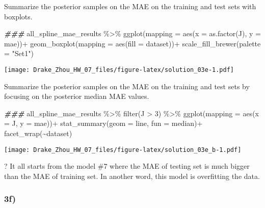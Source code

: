 \documentclass[
]{article}
\newenvironment{Shaded}{\begin{snugshade}}{\end{snugshade}}
\newcommand{\AttributeTok}[1]{\textcolor[rgb]{0.77,0.63,0.00}{#1}}
\newcommand{\DecValTok}[1]{\textcolor[rgb]{0.00,0.00,0.81}{#1}}
\newcommand{\DocumentationTok}[1]{\textcolor[rgb]{0.56,0.35,0.01}{\textbf{\textit{#1}}}}
\newcommand{\FunctionTok}[1]{\textcolor[rgb]{0.00,0.00,0.00}{#1}}
\newcommand{\NormalTok}[1]{#1}
\newcommand{\SpecialCharTok}[1]{\textcolor[rgb]{0.00,0.00,0.00}{#1}}
\newcommand{\StringTok}[1]{\textcolor[rgb]{0.31,0.60,0.02}{#1}}
\begin{document}
Summarize the posterior samples on the MAE on the training and test sets
with boxplots.

\begin{Shaded}
\begin{Highlighting}[]
\DocumentationTok{\#\#\# }
\NormalTok{all\_spline\_mae\_results }\SpecialCharTok{\%\textgreater{}\%}
  \FunctionTok{ggplot}\NormalTok{(}\AttributeTok{mapping =} \FunctionTok{aes}\NormalTok{(}\AttributeTok{x =} \FunctionTok{as.factor}\NormalTok{(J), }\AttributeTok{y =}\NormalTok{ mae))}\SpecialCharTok{+}
  \FunctionTok{geom\_boxplot}\NormalTok{(}\AttributeTok{mapping =} \FunctionTok{aes}\NormalTok{(}\AttributeTok{fill =}\NormalTok{ dataset))}\SpecialCharTok{+}
  \FunctionTok{scale\_fill\_brewer}\NormalTok{(}\AttributeTok{palette =} \StringTok{"Set1"}\NormalTok{)}
\end{Highlighting}
\end{Shaded}

\texttt{[image: Drake\_Zhou\_HW\_07\_files/figure-latex/solution\_03e-1.pdf]}

Summarize the posterior samples on the MAE on the training and test sets
by focusing on the posterior median MAE values.

\begin{Shaded}
\begin{Highlighting}[]
\DocumentationTok{\#\#\# }
\NormalTok{all\_spline\_mae\_results }\SpecialCharTok{\%\textgreater{}\%} \FunctionTok{filter}\NormalTok{(J }\SpecialCharTok{\textgreater{}} \DecValTok{3}\NormalTok{) }\SpecialCharTok{\%\textgreater{}\%}
  \FunctionTok{ggplot}\NormalTok{(}\AttributeTok{mapping =} \FunctionTok{aes}\NormalTok{(}\AttributeTok{x =}\NormalTok{ J, }\AttributeTok{y =}\NormalTok{ mae))}\SpecialCharTok{+}
  \FunctionTok{stat\_summary}\NormalTok{(}\AttributeTok{geom =} \StringTok{\textquotesingle{}line\textquotesingle{}}\NormalTok{, }\AttributeTok{fun =} \StringTok{\textquotesingle{}median\textquotesingle{}}\NormalTok{)}\SpecialCharTok{+}
  \FunctionTok{facet\_wrap}\NormalTok{(}\SpecialCharTok{\textasciitilde{}}\NormalTok{dataset)}
\end{Highlighting}
\end{Shaded}

\texttt{[image: Drake\_Zhou\_HW\_07\_files/figure-latex/solution\_03e\_b-1.pdf]}

? It all starts from the model \#7 where the MAE of testing set is much
bigger than the MAE of training set. In another word, this model is
overfitting the data.

\hypertarget{f-1}{%
\subsubsection{3f)}\label{f-1}}
\end{document}
